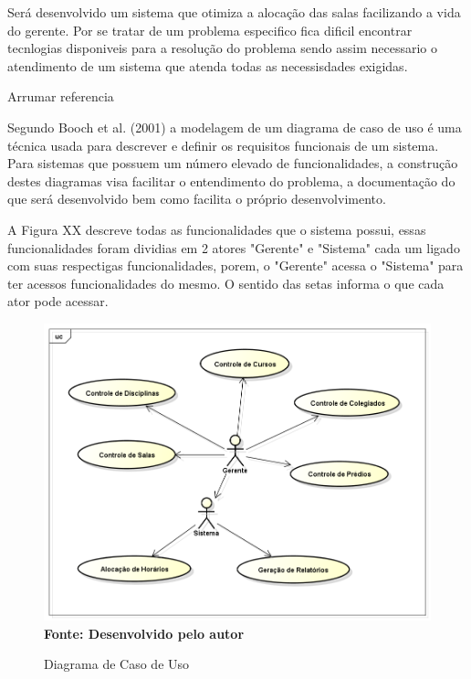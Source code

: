 \documentclass{abntpuc}
\begin{document}
%
%
%
%
%


Será desenvolvido um sistema que otimiza a alocação das salas facilizando a vida do gerente. Por se tratar de um problema especifico fica dificil encontrar tecnlogias disponiveis para a resolução do problema sendo assim necessario o atendimento de um sistema que atenda todas as necessisdades exigidas.



Arrumar referencia \par

Segundo Booch et al. (2001) a modelagem de um diagrama de caso de uso é uma técnica usada para descrever e definir os requisitos funcionais de um sistema. Para sistemas que possuem um número elevado de funcionalidades, a construção destes diagramas visa facilitar o entendimento do problema, a documentação do que será desenvolvido bem como facilita o próprio desenvolvimento.\par

A Figura XX descreve todas as funcionalidades que o sistema possui, essas funcionalidades foram dividias em 2 atores "Gerente" e "Sistema" cada um ligado com suas respectigas funcionalidades, porem, o "Gerente" acessa o "Sistema" para ter acessos funcionalidades do mesmo. O sentido das setas informa o que cada ator pode acessar.\par

\begin{figure}[!htb]
\caption[Diagrama de Caso de Uso]{Diagrama de Caso de Uso}
\label{fig:figura1}
\centering
\includegraphics[scale=0.5]{imagens/diagramaCasoUso.png}
\\ \textbf{\footnotesize Fonte: Desenvolvido pelo autor}
\end{figure}
\end{document}

